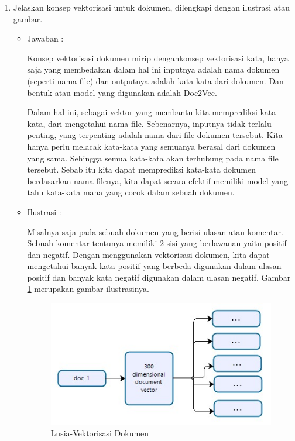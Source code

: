 \begin{enumerate}
\item Jelaskan konsep vektorisasi untuk dokumen, dilengkapi dengan ilustrasi atau
gambar.
	\begin{itemize}
	\item Jawaban :
		\par Konsep vektorisasi dokumen mirip dengankonsep vektorisasi kata, hanya saja yang membedakan dalam hal ini inputnya adalah nama dokumen (seperti nama file) dan outputnya adalah kata-kata dari dokumen. Dan bentuk atau model yang digunakan adalah Doc2Vec.
		\par Dalam hal ini, sebagai vektor yang membantu kita memprediksi kata-kata, dari mengetahui nama file. Sebenarnya, inputnya tidak terlalu penting, yang terpenting adalah nama dari file dokumen tersebut. Kita hanya perlu melacak kata-kata yang semuanya berasal dari dokumen yang sama. Sehingga semua kata-kata akan terhubung pada nama file tersebut. Sebab itu kita dapat memprediksi kata-kata dokumen berdasarkan nama filenya, kita dapat secara efektif memiliki model yang tahu kata-kata mana yang cocok dalam sebuah dokumen. 
	\item Ilustrasi :
		\par Misalnya saja pada sebuah dokumen yang berisi ulasan atau komentar. Sebuah komentar tentunya memiliki 2 sisi yang berlawanan yaitu positif dan negatif. Dengan menggunakan vektorisasi dokumen, kita dapat mengetahui banyak kata positif yang berbeda digunakan dalam ulasan positif dan banyak kata negatif digunakan dalam ulasan negatif. Gambar \ref{5a5} merupakan gambar ilustrasinya.
			\begin{figure}[ht]
			\centering
			\includegraphics[scale=0.5]{figures/p4.jpg}
			\caption{Lusia-Vektorisasi Dokumen}
			\label{5a5}
			\end{figure}
	\end{itemize}


\end{enumerate}
